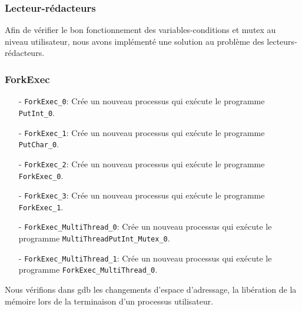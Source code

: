 \documentclass[11pt]{article}
\theoremstyle{definition}
\theoremstyle{definition}
\begin{document}
\subsubsection{Lecteur-rédacteurs}

Afin de vérifier le bon fonctionnement des variables-conditions et mutex
au niveau utilisateur, nous avons implémenté une solution au problème des
lecteurs-rédacteurs.

\subsubsection{ForkExec}
\begin{itemize}
\item[-] \texttt{ForkExec\_0}: Crée un nouveau processus qui exécute le programme \texttt{PutInt\_0}.
\item[-] \texttt{ForkExec\_1}: Crée un nouveau processus qui exécute le programme \texttt{PutChar\_0}.
\item[-] \texttt{ForkExec\_2}: Crée un nouveau processus qui exécute le programme \texttt{ForkExec\_0}.
\item[-] \texttt{ForkExec\_3}: Crée un nouveau processus qui exécute le programme \texttt{ForkExec\_1}.
\item[-] \texttt{ForkExec\_MultiThread\_0}: Crée un nouveau processus qui exécute le programme \texttt{MultiThreadPutInt\_Mutex\_0}.
\item[-] \texttt{ForkExec\_MultiThread\_1}: Crée un nouveau processus qui exécute le programme \texttt{ForkExec\_MultiThread\_0}.
\end{itemize}
Nous vérifions dans gdb les changements d'espace d'adressage, la libération de la mémoire lors de la terminaison d'un processus utilisateur.
\end{document}
